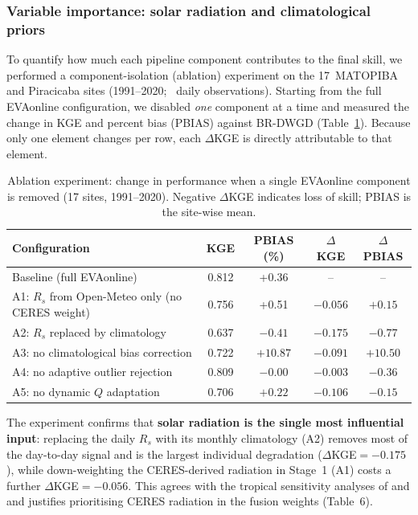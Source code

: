 \subsubsection{Variable importance: solar radiation and climatological priors}
\label{sec:ablation}

To quantify how much each pipeline component contributes to the final skill, we
performed a component-isolation (ablation) experiment on the 17~MATOPIBA and
Piracicaba sites (1991--2020; \Nobs~daily observations). Starting from the full
EVAonline configuration, we disabled \emph{one} component at a time and measured
the change in KGE and percent bias (PBIAS) against BR-DWGD
(Table~\ref{tab:ablation}). Because only one element changes per row, each
$\Delta$KGE is directly attributable to that element.

\begin{table}[!htbp]
\centering
\caption{Ablation experiment: change in performance when a single EVAonline
component is removed (17 sites, 1991--2020). Negative $\Delta$KGE indicates loss
of skill; PBIAS is the site-wise mean.}
\label{tab:ablation}
\small
\begin{tabular}{lcccc}
\toprule
Configuration & KGE & PBIAS (\%) & $\Delta$KGE & $\Delta$PBIAS \\
\midrule
Baseline (full EVAonline) & 0.812 & +0.36 & -- & -- \\
A1: $R_s$ from Open-Meteo only (no CERES weight) & 0.756 & +0.51 & $-0.056$ & $+0.15$ \\
A2: $R_s$ replaced by climatology & 0.637 & $-0.41$ & $-0.175$ & $-0.77$ \\
A3: no climatological bias correction & 0.722 & $+10.87$ & $-0.091$ & $+10.50$ \\
A4: no adaptive outlier rejection & 0.809 & $-0.00$ & $-0.003$ & $-0.36$ \\
A5: no dynamic $Q$ adaptation & 0.706 & $+0.22$ & $-0.106$ & $-0.15$ \\
\bottomrule
\end{tabular}
\end{table}

The experiment confirms that \textbf{solar radiation is the single most
influential input}: replacing the daily $R_s$ with its monthly climatology (A2)
removes most of the day-to-day signal and is the largest individual degradation
($\Delta$KGE${}=-0.175$), while down-weighting the CERES-derived radiation in
Stage~1 (A1) costs a further $\Delta$KGE${}=-0.056$. This agrees with the
tropical sensitivity analyses of \citet{Irizarry2023} and \citet{Paca2022} and
justifies prioritising CERES radiation in the fusion weights (Table~6).

